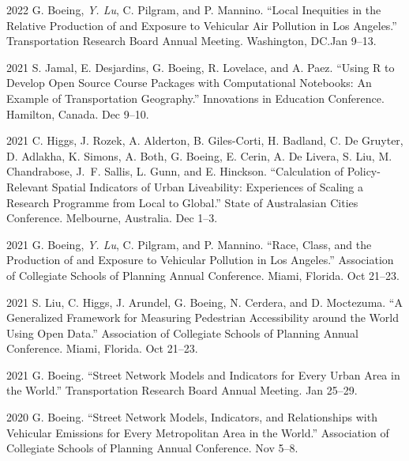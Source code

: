 \documentclass[11pt,letterpaper]{report}
\begin{document}
\begin{tablist}
        \item[2022] \tab{}G. Boeing, \textit{Y. Lu}, C. Pilgram, and P. Mannino. \enquote{Local Inequities in the Relative Production of and Exposure to Vehicular Air Pollution in Los Angeles.} Transportation Research Board Annual Meeting. Washington, DC.\@ Jan 9--13.

        \item[2021] \tab{}S. Jamal, E. Desjardins, G. Boeing, R. Lovelace, and A. Paez. \enquote{Using R to Develop Open Source Course Packages with Computational Notebooks: An Example of Transportation Geography.} Innovations in Education Conference. Hamilton, Canada. Dec 9--10.

        \item[2021] \tab{}C. Higgs, J. Rozek, A. Alderton, B. Giles-Corti, H. Badland, C. De Gruyter, D. Adlakha, K. Simons, A. Both, G. Boeing, E. Cerin, A. De Livera, S. Liu, M. Chandrabose, J.~F. Sallis, L. Gunn, and E. Hinckson. \enquote{Calculation of Policy-Relevant Spatial Indicators of Urban Liveability: Experiences of Scaling a Research Programme from Local to Global.} State of Australasian Cities Conference. Melbourne, Australia. Dec 1--3.

        \item[2021] \tab{}G. Boeing, \textit{Y. Lu}, C. Pilgram, and P. Mannino. \enquote{Race, Class, and the Production of and Exposure to Vehicular Pollution in Los Angeles.} Association of Collegiate Schools of Planning Annual Conference. Miami, Florida. Oct 21--23.

        \item[2021] \tab{}S. Liu, C. Higgs, J. Arundel, G. Boeing, N. Cerdera, and D. Moctezuma. \enquote{A Generalized Framework for Measuring Pedestrian Accessibility around the World Using Open Data.} Association of Collegiate Schools of Planning Annual Conference. Miami, Florida. Oct 21--23.

        \item[2021] \tab{}G. Boeing. \enquote{Street Network Models and Indicators for Every Urban Area in the World.} Transportation Research Board Annual Meeting. Jan 25--29.

        \item[2020] \tab{}G. Boeing. \enquote{Street Network Models, Indicators, and Relationships with Vehicular Emissions for Every Metropolitan Area in the World.} Association of Collegiate Schools of Planning Annual Conference. Nov 5--8.



\end{tablist}
\end{document}
